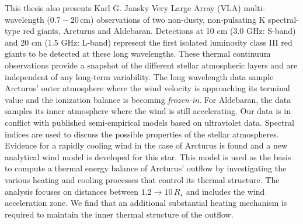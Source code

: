 \begin{abstracts}
This thesis also presents Karl G. Jansky Very Large Array (VLA) multi-wavelength ($0.7 - 20$\,cm) observations of two non-dusty, non-pulsating K spectral-type red giants, Arcturus and Aldebaran. Detections at 10 cm (3.0 GHz: S-band) and 20 cm (1.5 GHz: L-band) represent the first isolated luminosity class III red giants to be detected at these long wavelengths. These thermal continuum observations provide  a snapshot of the different stellar atmospheric layers and are independent of any long-term variability. The long wavelength data sample Arcturus' outer atmosphere where the wind velocity is approaching its terminal value and the ionization balance is becoming \textit{frozen-in}. For Aldebaran, the data samples its inner atmosphere where the wind is still accelerating. Our data is in conflict with published semi-empirical models based on ultraviolet data. Spectral indices are used to discuss the possible properties of the stellar atmospheres. Evidence for a rapidly cooling wind in the case of Arcturus is found and a new analytical wind model is developed for this star. This model is used as the basis to compute a thermal energy balance of Arcturus' outflow by investigating the various heating and cooling processes that control its thermal structure. The analysis focuses on distances between $1.2\rightarrow 10\,R_{\star}$ and includes the wind acceleration zone. We find that an additional substantial heating mechanism is required to maintain the inner thermal structure of the outflow.

\end{abstracts}

